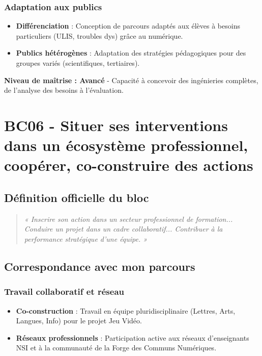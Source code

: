 \subsubsection{Adaptation aux publics}
\begin{itemize}[leftmargin=*]
    \item \textbf{Différenciation} : Conception de parcours adaptés aux élèves à besoins particuliers (ULIS, troubles dys) grâce au numérique.
    \item \textbf{Publics hétérogènes} : Adaptation des stratégies pédagogiques pour des groupes variés (scientifiques, tertiaires).
\end{itemize}

\textbf{Niveau de maîtrise : Avancé} - Capacité à concevoir des ingénieries complètes, de l'analyse des besoins à l'évaluation.

\vspace{1cm}

\section{BC06 - Situer ses interventions dans un écosystème professionnel, coopérer, co-construire des actions}

\subsection{Définition officielle du bloc}
\begin{quote}
\textit{« Inscrire son action dans un secteur professionnel de formation... Conduire un projet dans un cadre collaboratif... Contribuer à la performance stratégique d'une équipe. »} \parencite{rncp38152}
\end{quote}

\subsection{Correspondance avec mon parcours}

\subsubsection{Travail collaboratif et réseau}
\begin{itemize}[leftmargin=*]
    \item \textbf{Co-construction} : Travail en équipe pluridisciplinaire (Lettres, Arts, Langues, Info) pour le projet Jeu Vidéo.
    \item \textbf{Réseaux professionnels} : Participation active aux réseaux d'enseignants NSI et à la communauté de la Forge des Communs Numériques.
\end{itemize}

